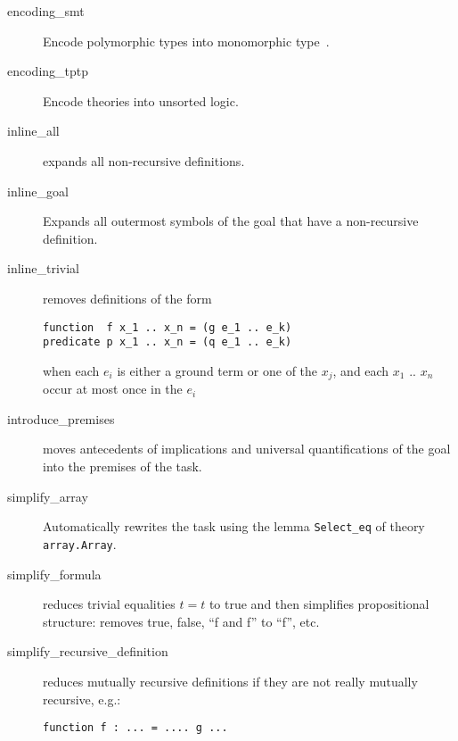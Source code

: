 \begin{description}
\item[encoding\_smt]
  Encode polymorphic types into monomorphic type~\cite{conchon08smt}.

\item[encoding\_tptp]
  Encode theories into unsorted logic. %





\item[inline\_all]
  expands all non-recursive definitions.

\item[inline\_goal] Expands all outermost symbols of the goal that
  have a non-recursive definition.

\item[inline\_trivial]
  removes definitions of the form

\begin{verbatim}
function  f x_1 .. x_n = (g e_1 .. e_k)
predicate p x_1 .. x_n = (q e_1 .. e_k)
\end{verbatim}
when each $e_i$ is either a ground term or one of the $x_j$, and
each $x_1$ .. $x_n$ occur at most once in the $e_i$

\item[introduce\_premises] moves antecedents of implications and
  universal quantifications of the goal into the premises of the task.


\item[simplify\_array] Automatically rewrites the task using the lemma
  \verb|Select_eq| of theory \verb|array.Array|.

\item[simplify\_formula] reduces trivial equalities $t=t$ to true and
  then simplifies propositional structure: removes true, false, ``f
  and f'' to ``f'', etc.

\item[simplify\_recursive\_definition] reduces mutually recursive
  definitions if they are not really mutually recursive, e.g.:
\begin{verbatim}
function f : ... = .... g ...


\end{verbatim}
\end{description}
